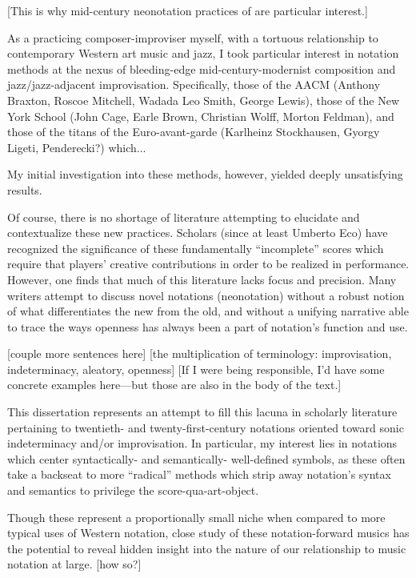 [This is why mid-century neonotation practices of are particular interest.]

As a practicing composer-improviser myself, with a tortuous relationship to contemporary Western art music and jazz, I took particular interest in notation methods at the nexus of bleeding-edge mid-century-modernist composition and jazz/jazz-adjacent improvisation.
Specifically, those of the AACM (Anthony Braxton, Roscoe Mitchell, Wadada Leo Smith, George Lewis), those of the New York School (John Cage, Earle Brown, Christian Wolff, Morton Feldman), and those of the titans of the Euro-avant-garde (Karlheinz Stockhausen, Gyorgy Ligeti, Penderecki?) which...

My initial investigation into these methods, however, yielded deeply unsatisfying results.

Of course, there is no shortage of literature attempting to elucidate and contextualize these new practices. Scholars (since at least Umberto Eco) have recognized the significance of these fundamentally ``incomplete'' scores which require that players' creative contributions in order to be realized in performance. 
However, one finds that much of this literature lacks focus and precision. Many writers attempt to discuss novel notations (neonotation) without a robust notion of what differentiates the new from the old, and without a unifying narrative able to trace the ways openness has always been a part of notation's function and use.

[couple more sentences here]
[the multiplication of terminology: improvisation, indeterminacy, aleatory, openness]
[If I were being responsible, I'd have some concrete examples here---but those are also in the body of the text.]

This dissertation represents an attempt to fill this lacuna in scholarly literature pertaining to twentieth- and twenty-first-century notations oriented toward sonic indeterminacy and/or improvisation. In particular, my interest lies in notations which center syntactically- and semantically- well-defined symbols, as these often take a backseat to more ``radical'' methods which strip away notation's syntax and semantics to privilege the score-qua-art-object.

Though these represent a proportionally small niche when compared to more typical uses of Western notation, close study of these notation-forward musics has the potential to reveal hidden insight into the nature of our relationship to music notation at large.
[how so?]

